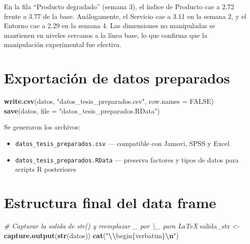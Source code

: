 \documentclass[
  spanish,
]{article}
\newenvironment{Shaded}{\begin{snugshade}}{\end{snugshade}}
\newcommand{\AttributeTok}[1]{\textcolor[rgb]{0.13,0.29,0.53}{#1}}
\newcommand{\CommentTok}[1]{\textcolor[rgb]{0.56,0.35,0.01}{\textit{#1}}}
\newcommand{\ConstantTok}[1]{\textcolor[rgb]{0.56,0.35,0.01}{#1}}
\newcommand{\FunctionTok}[1]{\textcolor[rgb]{0.13,0.29,0.53}{\textbf{#1}}}
\newcommand{\NormalTok}[1]{#1}
\newcommand{\OtherTok}[1]{\textcolor[rgb]{0.56,0.35,0.01}{#1}}
\newcommand{\SpecialCharTok}[1]{\textcolor[rgb]{0.81,0.36,0.00}{\textbf{#1}}}
\newcommand{\StringTok}[1]{\textcolor[rgb]{0.31,0.60,0.02}{#1}}
\begin{document}
En la fila ``Producto degradado'' (semana 3), el índice de Producto cae
a 2.72 frente a 3.77 de la base. Análogamente, el Servicio cae a 3.11 en
la semana 2, y el Entorno cae a 2.29 en la semana 4. Las dimensiones no
manipuladas se mantienen en niveles cercanos a la línea base, lo que
confirma que la manipulación experimental fue efectiva.

\section{Exportación de datos
preparados}\label{exportaciuxf3n-de-datos-preparados}

\begin{Shaded}
\begin{Highlighting}[]
\FunctionTok{write.csv}\NormalTok{(datos, }\StringTok{"datos\_tesis\_preparados.csv"}\NormalTok{, }\AttributeTok{row.names =} \ConstantTok{FALSE}\NormalTok{)}
\FunctionTok{save}\NormalTok{(datos, }\AttributeTok{file =} \StringTok{"datos\_tesis\_preparados.RData"}\NormalTok{)}
\end{Highlighting}
\end{Shaded}

Se generaron los archivos:

\begin{itemize}
  \item \texttt{datos\_tesis\_preparados.csv} --- compatible con Jamovi, SPSS y Excel
  \item \texttt{datos\_tesis\_preparados.RData} --- preserva factores y tipos de datos para scripts R posteriores
\end{itemize}

\section{Estructura final del data
frame}\label{estructura-final-del-data-frame}

\begin{Shaded}
\begin{Highlighting}[]
\CommentTok{\# Capturar la salida de str() y reemplazar \_ por \textbackslash{}\_ para LaTeX}
\NormalTok{salida\_str }\OtherTok{\textless{}{-}} \FunctionTok{capture.output}\NormalTok{(}\FunctionTok{str}\NormalTok{(datos))}
\FunctionTok{cat}\NormalTok{(}\StringTok{"}\SpecialCharTok{\textbackslash{}\textbackslash{}}\StringTok{begin\{verbatim\}}\SpecialCharTok{\textbackslash{}n}\StringTok{"}\NormalTok{)}
\end{Highlighting}
\end{Shaded}
\end{document}
